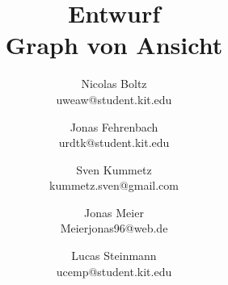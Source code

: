 \documentclass[a4paper]{scrreprt}
\begin{document}
\title{Entwurf\\
Graph von Ansicht}
\date{}
\author{Nicolas Boltz   \\ uweaw@student.kit.edu
  \and Jonas Fehrenbach \\ urdtk@student.kit.edu
  \and Sven Kummetz     \\ kummetz.sven@gmail.com
  \and Jonas Meier      \\ Meierjonas96@web.de
  \and Lucas Steinmann  \\ ucemp@student.kit.edu
}

\titlehead{\texttt{[image: resourcen/GAns.png]}}

\maketitle

{\small\tableofcontents}















\clearpage

%
\end{document}
